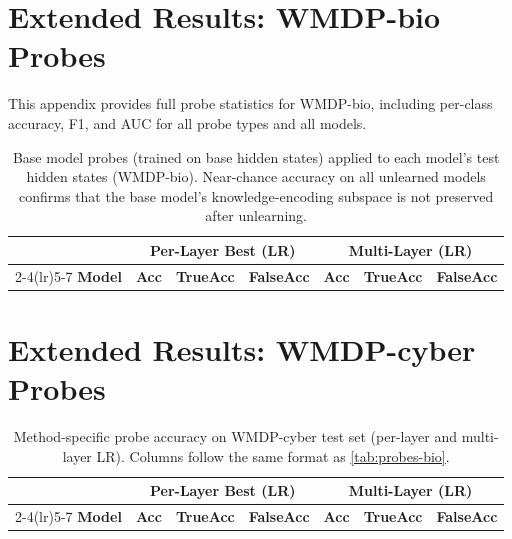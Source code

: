 \newpage
\appendix

\section{Extended Results: WMDP-bio Probes}
\label{app:bio-probes}

This appendix provides full probe statistics for WMDP-bio, including per-class
accuracy, F1, and AUC for all probe types and all models.

\begin{table}[H]
\centering
\caption{Base model probes (trained on base hidden states) applied to each model's
test hidden states (WMDP-bio).
Near-chance accuracy on all unlearned models confirms that the base model's
knowledge-encoding subspace is not preserved after unlearning.}
\label{tab:app-base-probes}
\small
\begin{tabular}{lcccccc}
\toprule
 & \multicolumn{3}{c}{\textbf{Per-Layer Best (LR)}} & \multicolumn{3}{c}{\textbf{Multi-Layer (LR)}} \\
\cmidrule(lr){2-4}\cmidrule(lr){5-7}
\textbf{Model} & \textbf{Acc} & \textbf{TrueAcc} & \textbf{FalseAcc} & \textbf{Acc} & \textbf{TrueAcc} & \textbf{FalseAcc} \\
\midrule

\bottomrule
\end{tabular}
\end{table}

\section{Extended Results: WMDP-cyber Probes}
\label{app:cyber-probes}

\begin{table}[H]
\centering
\caption{Method-specific probe accuracy on WMDP-cyber test set (per-layer and multi-layer LR).
Columns follow the same format as \cref{tab:probes-bio}.}
\label{tab:app-cyber-probes}
\small
\begin{tabular}{lcccccc}
\toprule
 & \multicolumn{3}{c}{\textbf{Per-Layer Best (LR)}} & \multicolumn{3}{c}{\textbf{Multi-Layer (LR)}} \\
\cmidrule(lr){2-4}\cmidrule(lr){5-7}
\textbf{Model} & \textbf{Acc} & \textbf{TrueAcc} & \textbf{FalseAcc} & \textbf{Acc} & \textbf{TrueAcc} & \textbf{FalseAcc} \\
\midrule

\bottomrule
\end{tabular}
\end{table}

